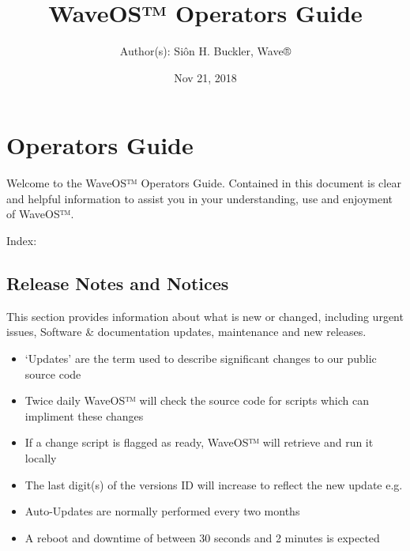 \documentclass[letterpaper,10pt,english]{sphinxmanual}
\title{WaveOS™ Operators Guide}
\date{Nov 21, 2018}
\author{Author(s): Siôn H. Buckler, Wave®}
\begin{document}
\pagestyle{empty}
\maketitle
\pagestyle{plain}
\sphinxtableofcontents
\pagestyle{normal}
\label{\detokenize{index::doc}}



\chapter{Operators Guide}
\label{\detokenize{index:operators-guide}}
Welcome to the WaveOS™ Operators Guide. Contained in this document is clear and helpful information to assist you in your understanding, use and enjoyment of WaveOS™.

Index:


\section{Release Notes and Notices}
\label{\detokenize{releasenotes:release-notes-and-notices}}\label{\detokenize{releasenotes::doc}}
This section provides information about what is new or changed, including urgent issues, Software \& documentation updates, maintenance and new releases.
\begin{itemize}
\item {} 
‘Updates’ are the term used to describe significant changes to our public source code

\item {} 
Twice daily WaveOS™ will check the source code for scripts which can impliment these changes

\item {} 
If a change script is flagged as ready, WaveOS™ will retrieve and run it locally

\item {} 
The last digit(s) of the versions ID will increase to reflect the new update e.g. 

\item {} 
Auto-Updates are normally performed every two months

\item {} 
A reboot and downtime of between 30 seconds and 2 minutes is expected

\end{itemize}
\end{document}
